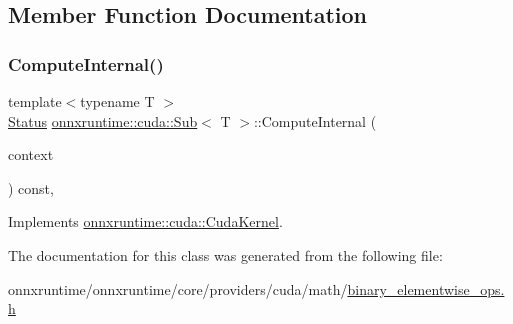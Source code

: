 \subsection{Member Function Documentation}
\mbox{\label{classonnxruntime_1_1cuda_1_1Sub_aeb5dd41089760e5498a11583933a7976}} 
\subsubsection{\texorpdfstring{Compute\+Internal()}{ComputeInternal()}}
{\footnotesize\ttfamily template$<$typename T $>$ \\
\mbox{\hyperlink{classonnxruntime_1_1common_1_1Status}{Status}} \mbox{\hyperlink{classonnxruntime_1_1cuda_1_1Sub}{onnxruntime\+::cuda\+::\+Sub}}$<$ T $>$\+::Compute\+Internal (\begin{DoxyParamCaption}\item[{\mbox{\hyperlink{classonnxruntime_1_1OpKernelContext}{Op\+Kernel\+Context}} $\ast$}]{context }\end{DoxyParamCaption}) const\hspace{0.3cm}{\ttfamily [override]}, {\ttfamily [virtual]}}



Implements \mbox{\hyperlink{classonnxruntime_1_1cuda_1_1CudaKernel_aca7af04ae448017d6023d30bba231ebb}{onnxruntime\+::cuda\+::\+Cuda\+Kernel}}.



The documentation for this class was generated from the following file\+:\begin{DoxyCompactItemize}
\item 
onnxruntime/onnxruntime/core/providers/cuda/math/\mbox{\hyperlink{binary__elementwise__ops_8h}{binary\+\_\+elementwise\+\_\+ops.\+h}}\end{DoxyCompactItemize}

